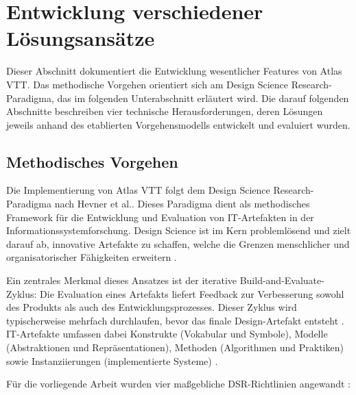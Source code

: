\section{Entwicklung verschiedener Lösungsansätze}
\label{sec:Loesungsansaetze}

Dieser Abschnitt dokumentiert die Entwicklung wesentlicher Features von Atlas \ac{VTT}. Das methodische Vorgehen orientiert sich am Design Science Research-Paradigma, das im folgenden Unterabschnitt erläutert wird. Die darauf folgenden Abschnitte beschreiben vier technische Herausforderungen, deren Lösungen jeweils anhand des etablierten Vorgehensmodells entwickelt und evaluiert wurden.

\subsection{Methodisches Vorgehen}
\label{subsec:methodisches-vorgehen}

Die Implementierung von Atlas \ac{VTT} folgt dem Design Science Research-Paradigma nach Hevner et al.\autocite[S. 76]{Hevner2004DesignScience}. Dieses Paradigma dient als methodisches Framework für die Entwicklung und Evaluation von IT-Artefakten in der Informationssystemforschung. Design Science ist im Kern problemlösend und zielt darauf ab, innovative Artefakte zu schaffen, welche die Grenzen menschlicher und organisatorischer Fähigkeiten erweitern \autocite[S. 75]{Hevner2004DesignScience}.

Ein zentrales Merkmal dieses Ansatzes ist der iterative Build-and-Evaluate-Zyklus: Die Evaluation eines Artefakts liefert Feedback zur Verbesserung sowohl des Produkts als auch des Entwicklungsprozesses. Dieser Zyklus wird typischerweise mehrfach durchlaufen, bevor das finale Design-Artefakt entsteht \autocite[S. 78]{Hevner2004DesignScience}. IT-Artefakte umfassen dabei Konstrukte (Vokabular und Symbole), Modelle (Abstraktionen und Repräsentationen), Methoden (Algorithmen und Praktiken) sowie Instanziierungen (implementierte Systeme) \autocite[S. 77]{Hevner2004DesignScience}.

Für die vorliegende Arbeit wurden vier maßgebliche DSR-Richtlinien angewandt \autocite[S. 83]{Hevner2004DesignScience}:

